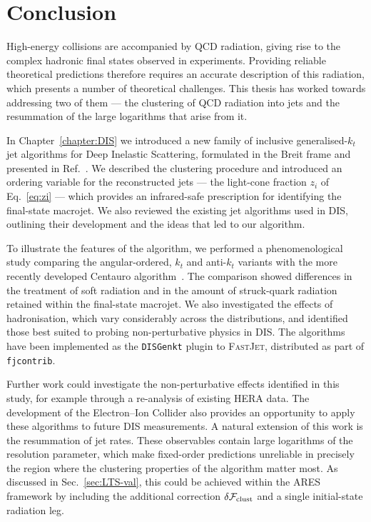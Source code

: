 \chapter{Conclusion}
\label{ch:conc}

High-energy collisions are accompanied by QCD radiation, giving rise to the
complex hadronic final states observed in experiments. Providing reliable
theoretical predictions therefore requires an accurate description of this
radiation, which presents a number of theoretical challenges. This thesis 
has worked towards addressing two of them --- the clustering of QCD radiation into jets and the
resummation of the large logarithms that arise from it.


In Chapter~\ref{chapter:DIS} we introduced a new family of inclusive
generalised-$k_t$ jet algorithms for Deep Inelastic Scattering, formulated in
the Breit frame and presented in Ref.~\cite{vanBeekveld:2026rez}. 
We described the clustering procedure and
introduced an ordering variable for the reconstructed jets --- the
light-cone fraction $z_i$ of Eq.~\eqref{eq:zi} --- which provides an
infrared-safe prescription for identifying the final-state macrojet. We
also reviewed the existing jet algorithms used in DIS, outlining their
development and the ideas that led to our algorithm. 

To illustrate the features of the algorithm, we performed a phenomenological study
comparing the angular-ordered, $k_t$ and anti-$k_t$ variants with the more
recently developed Centauro algorithm~\cite{Arratia:2020ssx}. The
comparison showed differences in the treatment of soft radiation and in
the amount of struck-quark radiation retained within the final-state
macrojet. We also investigated the effects of hadronisation, which vary
considerably across the distributions, and identified those best
suited to probing non-perturbative physics in DIS. The algorithms have been
implemented as the \texttt{DISGenkt} plugin
to \textsc{FastJet}, distributed as part of \texttt{fjcontrib}.

Further work could investigate the non-perturbative effects identified in
this study, for example through a re-analysis of existing HERA data. The
development of the Electron--Ion Collider also provides an
opportunity to apply these algorithms to future DIS measurements. A
natural extension of this work is the resummation of jet rates. These
observables contain large logarithms of the resolution parameter, which make
fixed-order predictions unreliable in precisely the region where the
clustering properties of the algorithm matter most. As discussed in
Sec.~\ref{sec:LTS-val}, this could be achieved within the \textsc{ARES}
framework by including the additional correction
$\delta\mathcal{F}_{\rm clust}$ and a single initial-state radiation leg.


